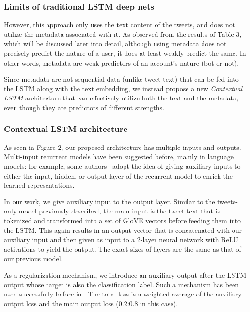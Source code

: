 \subsubsection{Limits of traditional LSTM deep nets}

However, this approach only uses the text content of the tweets, and does not utilize the metadata associated with it. As observed from the results of Table 3, which will be discussed later into detail, although using metadata does not precisely predict the nature of a user, it does at least weakly predict the same. In other words, metadata are weak predictors of an account's nature (bot or not). 

Since metadata are not sequential data (unlike tweet text) that can be fed into the LSTM along with the text embedding, we instead propose a new \textit{Contextual LSTM} architecture that can effectively utilize both the text and the metadata, even though they are predictors of different strengths. \par

\subsubsection{Contextual LSTM architecture}
As seen in Figure 2, our proposed architecture has multiple inputs and outputs. Multi-input recurrent models have been suggested before, mainly in language models: for example, some authors~\cite{hoang2016incorporating,auli2013joint,mikolov2012context} adopt the idea of giving auxiliary inputs to either the input, hidden, or output layer of the recurrent model to enrich the learned representations. 

In our work, we give auxiliary input to the output layer. Similar to the tweets-only model previously described, the main input is the tweet text that is tokenized and transformed into a set of GloVE vectors before feeding them into the LSTM. This again results in an output vector that is concatenated with our auxiliary input and then given as input to a 2-layer neural network with ReLU activations to yield the output. The exact sizes of layers are the same as that of our previous model. 

As a regularization mechanism, we introduce an auxiliary output after the LSTM output whose target is also the classification label. Such a mechanism has been used successfully before in \cite{szegedy2015going}. The total loss is a weighted average of the auxiliary output loss and the main output loss (0.2:0.8 in this case).



